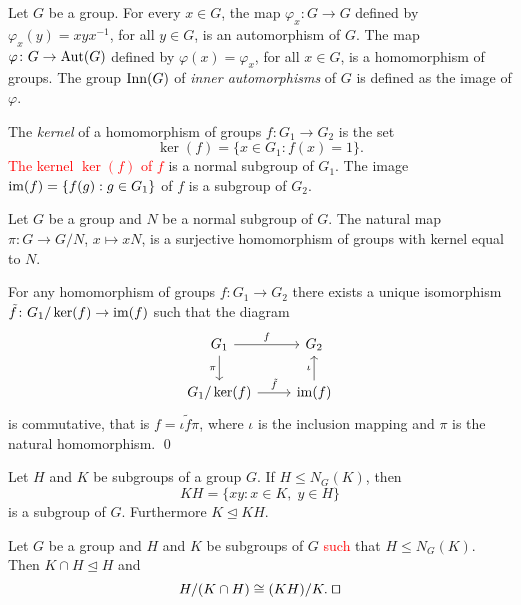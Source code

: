 \begin{example}
	Let $G$ be a group. For every $x\in G$, the map $\varphi_x\colon G\rightarrow G$ defined by $\varphi_x(y)=xyx^{-1}$, for all $y\in G$, is an automorphism of $G$. The map $\varphi\colon G\rightarrow \operatorname{Aut}(G)$ defined by $\varphi(x)=\varphi_x$, for all $x\in G$, is a homomorphism of groups. 
    The group $\mathrm{Inn}(G)$ of {\em inner automorphisms} of $G$ is defined as the 
	image of $\varphi$.
\end{example}

The {\em kernel} of a homomorphism of groups $f\colon G_1\rightarrow G_2$ is the set
\[
\ker (f)=\{ x\in G_1: f(x)=1\}.
\]
\textcolor{red}{The kernel $\ker(f)$ of $f$} is a normal 
subgroup of $G_1$. The image $\operatorname{im}(f)=\{f(g):g\in G_1\}$ 
of $f$ is a subgroup of $G_2$.

\begin{example}
Let $G$ be a group and $N$ be a normal subgroup of $G$. 
The natural map $\pi\colon G\rightarrow G/N$, $x\mapsto xN$, is a surjective homomorphism of groups with kernel equal to $N$.
\end{example}

\begin{theorem}
	For any homomorphism of groups $f\colon G_1\rightarrow G_2$ there exists a unique isomorphism $\tilde f\colon G_1/\ker(f)\rightarrow\operatorname{im}(f)$ such that the diagram
	\[\begin{tikzcd}
		{G_1} & {G_2} \\
		{G_1/\ker(f)} & {\im(f)}
		\arrow["f", from=1-1, to=1-2]
		\arrow["{\pi}"', from=1-1, to=2-1]
		\arrow["{\iota}", from=2-2, to=1-2]
		\arrow["{\tilde f}", from=2-1, to=2-2]
	\end{tikzcd}
	\]
	is commutative, that is $f=\iota\tilde f\pi$, 
	where $\iota$ is the inclusion mapping and $\pi$ is the natural homomorphism. \qed	
\end{theorem} 
 

Let $H$ and $K$ be subgroups of a group $G$. If $H\leq N_G(K)$, 
then \[
KH=\{xy: x\in K,\; y\in H\}
\]
is a subgroup of $G$. Furthermore $K\unlhd KH$.

\begin{theorem}
	Let $G$ be a group and $H$ and $K$ be subgroups of $G$ 
	\textcolor{red}{such} that $H\leq N_G(K)$. Then $K\cap H\unlhd H$ and
	\[
	H/(K\cap H)\cong (KH)/K.\;\qed
	\]
\end{theorem}

